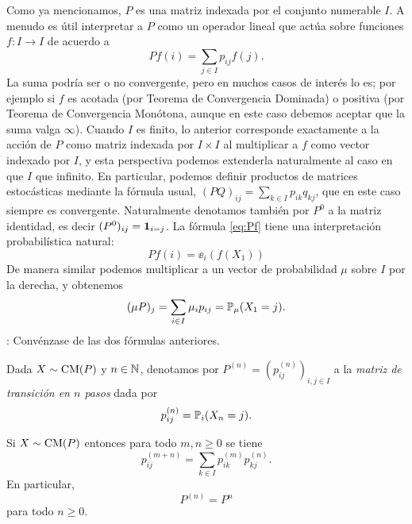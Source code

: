 Como ya mencionamos, $P$ es una matriz indexada por el conjunto numerable $I$.
A menudo es útil interpretar a $P$ como un operador lineal que actúa sobre funciones $f\!:I\longrightarrow I$ de acuerdo a 
\begin{equation}
Pf(i)=\sum_{j\in I}p_{ij}f(j).\label{eq:Pf}
\end{equation}
La suma podría ser o no convergente, pero en muchos casos de interés lo es; por ejemplo si $f$ es acotada (por Teorema de Convergencia Dominada) o positiva (por Teorema de Convergencia Monótona, aunque en este caso debemos aceptar que la suma valga $\infty$).
Cuando $I$ es finito, lo anterior corresponde exactamente a la acción de $P$ como matriz indexada por $I\times I$ al multiplicar a $f$ como vector indexado por $I$, y esta perspectiva podemos extenderla naturalmente al caso en que $I$ que infinito.
\lsep
En particular, podemos definir productos de matrices estocásticas mediante la fórmula usual, $(PQ)_{ij}=\sum_{k\in I}p_{ik}q_{kj}$, que en este caso siempre es convergente.
Naturalmente denotamos también por $P^0$ a la matriz identidad, es decir $(P^0)_{ij}=\mathbf{1}_{i=j}$.
\lsep
La fórmula \eqref{eq:Pf} tiene una interpretación probabilística natural:
\[Pf(i)=\ee_{i}(f(X_1))\]
De manera similar podemos multiplicar a un vector de probabilidad $\mu$ sobre $I$ por la derecha, y obtenemos
\[(\mu P)_j=\sum_{i\in I}\mu_ip_{ij}=\mathbb{P}_\mu(X_1=j).\]
\uexer: Convénzase de las dos fórmulas anteriores.

\begin{defn}
Dada $X\sim\text{\upshape{CM}}(P)$ y $n\in\mathbb{N}$, denotamos por $P^{(n)}=(p^{(n)}_{ij})_{i,j\in I}$ a la \emph{matriz de transición en $n$ pasos} dada por
\[p^{(n)}_{ij}=\mathbb{P}_i(X_n=j).\]
\end{defn}

\begin{thm}
Si $X\sim\text{\upshape{CM}}(P)$ entonces para todo $m,n\geq0$ se tiene
\[p^{(m+n)}_{ij}=\sum_{k\in I}p^{(m)}_{ik}p^{(n)}_{kj}.\]
En particular, 
\[P^{(n)}=P^n\] 
para todo $n\geq0$.
\end{thm}


